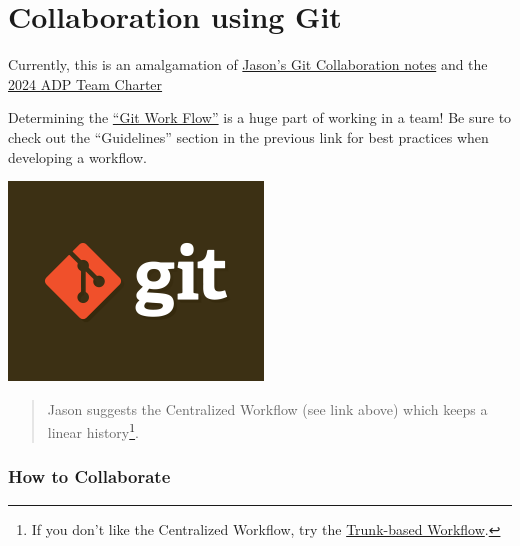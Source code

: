 \documentclass[
  letterpaper,
  DIV=11,
  numbers=noendperiod]{scrreprt}
\begin{document}
\section{Collaboration using Git}\label{collaboration-using-git}

Currently, this is an amalgamation of
\href{https://docs.google.com/document/d/1lcchh6ggKS5-Sf7G3zwyRz1AA_XVxb7rc8Id_k5GEOo/edit\#heading=h.k1i0lpeyjkx}{Jason's
Git Collaboration notes} and the
\href{https://docs.google.com/document/d/1spu2uv0KmV2_aW64qwe2pJndPrSeHNEj1Utzi_lLpjU/edit\#heading=h.84v7rojjdy4y}{2024
ADP Team Charter}

Determining the
\href{https://www.atlassian.com/git/tutorials/comparing-workflows}{``Git
Work Flow''} is a huge part of working in a team! Be sure to check out
the ``Guidelines'' section in the previous link for best practices when
developing a workflow.

\includegraphics[width=\textwidth,height=2.08333in]{_img/git.png}

\begin{quote}
Jason suggests the Centralized Workflow (see link above) which keeps a
linear history\footnote{If you don't like the Centralized Workflow, try
  the
  \href{https://www.atlassian.com/continuous-delivery/continuous-integration/trunk-based-development}{Trunk-based
  Workflow}.}.
\end{quote}

\subsubsection{How to Collaborate}\label{how-to-collaborate}
\end{document}
